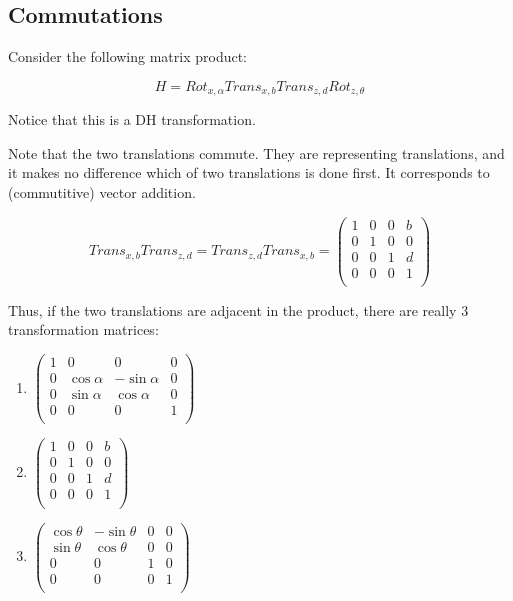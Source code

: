 \documentclass{article}
\begin{document}
\subsection{Commutations}

Consider the following matrix product:

\[ H = Rot_{x, \alpha} Trans_{x, b} Trans_{z, d} Rot_{z, \theta} \]

Notice that this is a DH transformation.

Note that the two translations commute.
They are representing translations, and it makes no difference
	which of two translations is done first.
It corresponds to (commutitive) vector addition.

\[ Trans_{x,b} Trans_{z,d} = Trans_{z, d} Trans_{x, b} 
	= \left( 
	\begin{matrix}
		1 & 0 & 0 & b\\
		0 & 1 & 0 & 0\\
		0 & 0 & 1 & d\\
		0 & 0 & 0 & 1 \\
	\end{matrix} \right) \]

Thus, if the two translations are adjacent in the product, 
	there are really 3 transformation matrices:

\begin{enumerate}
\item $ \left( 
	\begin{matrix}
		1 & 0 & 0 & 0\\
		0 & \cos \alpha & - \sin \alpha & 0\\
		0 & \sin \alpha & \cos \alpha & 0\\
		0 & 0 & 0 & 1 \\
	\end{matrix} \right)$
\item $\left( 
	\begin{matrix}
		1 & 0 & 0 & b\\
		0 & 1 & 0 & 0\\
		0 & 0 & 1 & d\\
		0 & 0 & 0 & 1 \\
	\end{matrix} \right)  $
\item $\left( 
	\begin{matrix}
		\cos \theta & - \sin \theta & 0 & 0\\
		\sin \theta & \cos \theta & 0 & 0\\
		0 & 0 & 1 & 0\\
		0 & 0 & 0 & 1 \\
	\end{matrix} \right) $
\end{enumerate}
\end{document}
